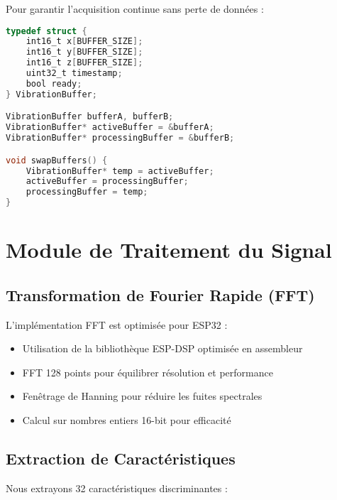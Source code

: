 Pour garantir l'acquisition continue sans perte de données :

\begin{lstlisting}[language=C, caption=Double buffering pour acquisition continue]
typedef struct {
    int16_t x[BUFFER_SIZE];
    int16_t y[BUFFER_SIZE];
    int16_t z[BUFFER_SIZE];
    uint32_t timestamp;
    bool ready;
} VibrationBuffer;

VibrationBuffer bufferA, bufferB;
VibrationBuffer* activeBuffer = &bufferA;
VibrationBuffer* processingBuffer = &bufferB;

void swapBuffers() {
    VibrationBuffer* temp = activeBuffer;
    activeBuffer = processingBuffer;
    processingBuffer = temp;
}
\end{lstlisting}

\section{Module de Traitement du Signal}

\subsection{Transformation de Fourier Rapide (FFT)}

L'implémentation FFT est optimisée pour ESP32 :

\begin{itemize}
    \item Utilisation de la bibliothèque ESP-DSP optimisée en assembleur
    \item FFT 128 points pour équilibrer résolution et performance
    \item Fenêtrage de Hanning pour réduire les fuites spectrales
    \item Calcul sur nombres entiers 16-bit pour efficacité
\end{itemize}

\subsection{Extraction de Caractéristiques}

Nous extrayons 32 caractéristiques discriminantes :


